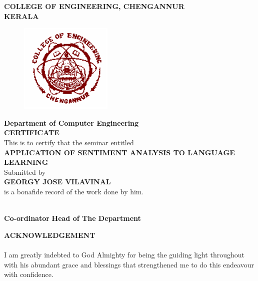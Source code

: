 \documentclass[a4paper,12pt,oneside]{article}
\begin{document}
\begin{center}
\setlength{\baselineskip}{1.5\baselineskip}
{\large\textbf{COLLEGE OF ENGINEERING, CHENGANNUR}}
\\
{\large\textbf{KERALA}}
\\
\begin{figure}[H]
\centering
\includegraphics{ceclogo.png}
\end{figure}
\setlength{\baselineskip}{1.5\baselineskip}
\textbf{Department of Computer Engineering}
\\
\textbf{CERTIFICATE}
\\
This is to certify that the seminar entitled
\\
\textbf{APPLICATION OF SENTIMENT ANALYSIS TO LANGUAGE LEARNING}
\\
Submitted by
\\
\textbf{GEORGY JOSE VILAVINAL}
\\
is a bonafide record of the work done by him.
\end{center}
\vspace{14ex}
\hspace{55ex}
\\
\vspace{2ex}
\hspace{0ex}
\textbf{
Co-ordinator}
\hspace{45ex}
\textbf{
Head of The Department}
\newpage
{}


\renewcommand{\headrulewidth}{0.0pt}
\renewcommand{\footrulewidth}{0.0pt}



\begin{center}
\large{\textbf{ACKNOWLEDGEMENT}}
\end{center}
\vspace{6ex}
\setlength{\baselineskip}{1.5\baselineskip}

\paragraph{}
I am greatly indebted to God Almighty for being the guiding light throughout with his
abundant grace and blessings that strengthened me to do this endeavour with confidence.
\end{document}
